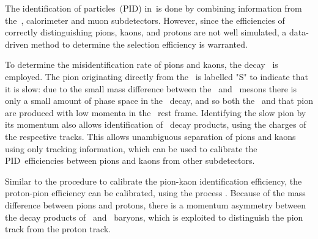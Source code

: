 The identification of particles~(PID) in~\lhcb is done by combining information from the~\rich, calorimeter and muon subdetectors.
However, since the efficiencies of correctly distinguishing pions, kaons, and protons are not well simulated, a data-driven method to determine the selection efficiency is warranted.

To determine the misidentification rate of pions and kaons, the decay \DstarDPi~is employed.
The pion originating directly from the \Dstarm~is labelled "S" to indicate that it is slow: due to the small mass difference between the \Dstarm~and \Dz~mesons there is only a small amount of phase space in the \Dstarm~decay, and so both the \Dz~and that pion are produced with low momenta in the \Dstarm~rest frame.
Identifying the slow pion by its momentum also allows identification of \Dz~decay products, using the charges of the respective tracks.
This allows unambiguous separation of pions and kaons using only tracking information, which can be used to calibrate the PID~efficiencies between pions and kaons from other subdetectors.

Similar to the procedure to calibrate the pion-kaon identification efficiency, the proton-pion efficiency can be calibrated, using the process \Lzppi.
Because of the mass difference between pions and protons, there is a momentum asymmetry between the decay products of \Lz~and \Lbar~baryons, which is exploited to distinguish the pion track from the proton track.

